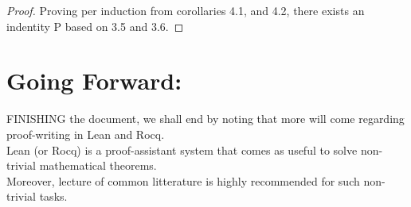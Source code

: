 \documentclass[10pt]{article}
\theoremstyle{plain}
\theoremstyle{definition}
\theoremstyle{remark}
\begin{document}
\begin{proof}
	Proving per induction from corollaries 4.1, and 4.2, there exists an indentity P based on 3.5 and 3.6.
\end{proof}

\section{Going Forward:}

\lettrine[lines=2, lhang=0.1, loversize=0.2]{F}INISHING the document, we shall end by noting that more will come regarding proof-writing in Lean and Rocq.\\Lean (or Rocq) is a proof-assistant system that comes as useful to solve non-trivial mathematical theorems.\\Moreover, lecture of common litterature is highly recommended for such non-trivial tasks.

\nocite{*}





\end{document}
